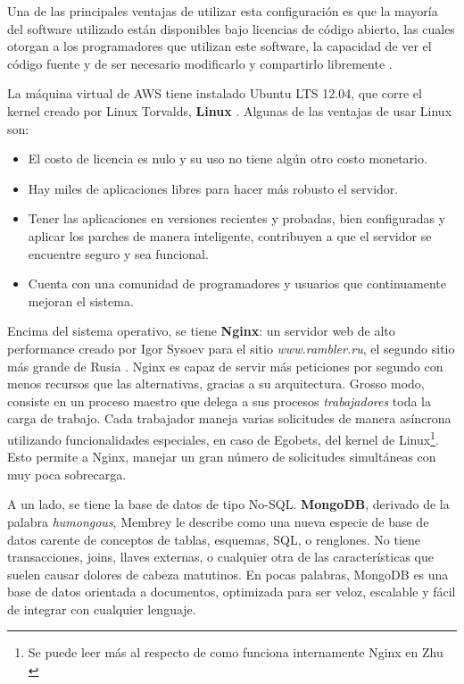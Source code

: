 Una de las principales ventajas de utilizar esta configuración es que la mayoría del software utilizado están disponibles bajo licencias de código abierto, las cuales otorgan a los programadores que utilizan este software, la capacidad de ver el código fuente y de ser necesario modificarlo y compartirlo libremente \cite{lozano2008software}.

La máquina virtual de AWS tiene instalado Ubuntu LTS 12.04, que corre el kernel creado por Linux Torvalds, \textbf{Linux} \cite{torvalds2001just}. Algunas de las ventajas de usar Linux son:
		\begin{itemize}
 			\item El costo de licencia es nulo y su uso no tiene algún otro costo monetario.
 			\item Hay miles de aplicaciones libres para hacer más robusto el servidor.
 			\item Tener las aplicaciones en versiones recientes y probadas, bien configuradas y aplicar los parches de manera inteligente, contribuyen a que el servidor se encuentre seguro y sea funcional.
 			\item Cuenta con una comunidad de programadores y usuarios que continuamente mejoran el sistema.
 		\end{itemize}

Encima del sistema operativo, se tiene \textbf{Nginx}: un servidor web de alto performance creado por Igor Sysoev para el sitio \emph{www.rambler.ru}, el segundo sitio más grande de Rusia \cite{reese2008nginx}. Nginx es capaz de servir más peticiones por segundo con menos recursos que las alternativas, gracias a su arquitectura. Grosso modo, consiste en un proceso maestro que delega a sus procesos \emph{trabajadores} toda la carga de trabajo. Cada trabajador maneja varias solicitudes de manera asíncrona utilizando funcionalidades especiales, en caso de Egobets, del kernel de Linux\footnote{Se puede leer más al respecto de como funciona internamente Nginx en Zhu \cite{zhu2010nginx}}. Esto permite a Nginx, manejar un gran número de solicitudes simultáneas con muy poca sobrecarga.

A un lado, se tiene la base de datos de tipo No-SQL. \textbf{MongoDB}, derivado de la palabra \emph{humongous}, Membrey \cite{membrey2010definitive} le describe como una nueva especie de base de datos carente de conceptos de tablas, esquemas, SQL, o renglones. No tiene transacciones, joins, llaves externas, o cualquier otra de las características que suelen causar dolores de cabeza matutinos. En pocas palabras, MongoDB es una base de datos orientada a documentos, optimizada para ser veloz, escalable y fácil de integrar con cualquier lenguaje.

